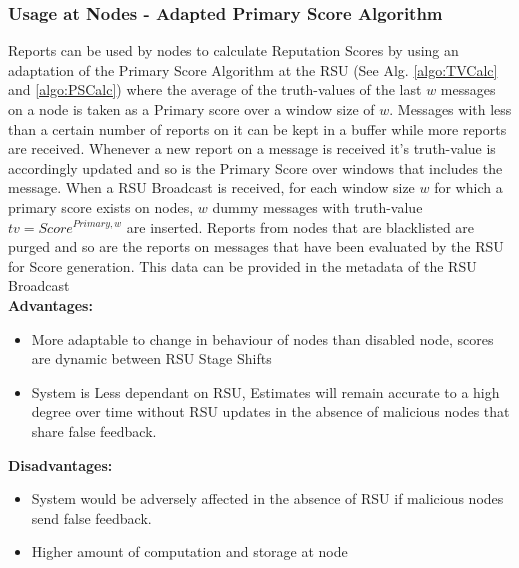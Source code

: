 \documentclass[journal]{IEEEtran}
\begin{document}
\subsubsection{Usage at Nodes - Adapted Primary Score Algorithm}
Reports can be used by nodes to calculate Reputation Scores by using an adaptation of the Primary Score Algorithm at the RSU (See Alg. \ref{algo:TVCalc} and \ref{algo:PSCalc}) where the average of the truth-values of the last $ w $ messages on a node is taken as a Primary score over a window size of $ w $. Messages with less than a certain number of reports on it can be kept in a buffer while more reports are received. Whenever a new report on a message is received it's truth-value is accordingly updated and so is the Primary Score over windows that includes the message. When a RSU Broadcast is received, for each window size $ w $ for which a primary score exists on nodes, $ w $ dummy messages with truth-value $ tv = Score^{Primary,w} $ are inserted. Reports from nodes that are blacklisted are purged and so are the reports on messages that have been evaluated by the RSU for Score generation. This data can be provided in the metadata of the RSU Broadcast\\
\textbf{Advantages:}
\begin{itemize}
	\item More adaptable to change in behaviour of nodes than disabled node, scores are dynamic between RSU Stage Shifts
	\item System is Less dependant on RSU, Estimates will remain accurate to a high degree over time without RSU updates in the absence of malicious nodes that share false feedback.
\end{itemize}
\textbf{Disadvantages:} 
\begin{itemize}
	\item System would be adversely affected in the absence of RSU if malicious nodes send false feedback.
	\item Higher amount of computation and storage at node
\end{itemize}
\end{document}
